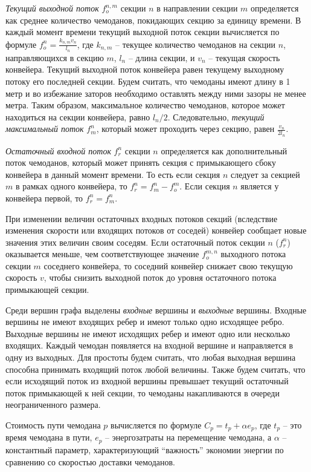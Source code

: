 \documentclass[specification, annotation]{itmo-student-thesis}
\begin{document}
\textit{Текущий выходной поток} $f_o^{n,m}$ секции $n$ в направлении секции
$m$ определяется как среднее количество чемоданов, покидающих секцию за единицу
времени. В каждый момент времени текущий выходной поток секции вычисляется по
формуле $f_o^n = \frac{k_{n,m} v_n}{l_n}$, где $k_{n,m}$ -- текущее количество чемоданов
на секции $n$, направляющихся в секцию $m$, $l_n$ -- длина секции, и $v_n$ --
текущая скорость конвейера. Текущий выходной поток конвейера равен текущему
выходному потоку его последней секции. Будем считать, что чемоданы имеют длину в
1 метр и во избежание заторов необходимо оставлять между ними зазоры не менее
метра. Таким образом, максимальное количество чемоданов, которое может
находиться на секции конвейера, равно $l_n/2$. Следовательно, \textit{текущий максимальный поток} $f_m^n$, который может
проходить через секцию, равен $\frac{v_n}{2l_n}$.

\textit{Остаточный входной поток} $f_r^n$ секции $n$ определяется как дополнительный поток
чемоданов, который может принять секция с примыкающего сбоку конвейера в данный момент
времени. То есть если секция $n$ следует за секцией $m$ в рамках одного
конвейера, то $f_r^n = f_m^n - f_o^m$. Если секция $n$ является у конвейера
первой, то $f_r^n = f_m^n$.

При изменении величин остаточных входных потоков секций (вследствие изменения
скорости или входящих потоков от соседей) конвейер сообщает новые значения этих
величин своим соседям. Если остаточный поток секции $n$ ($f_r^n$) оказывается меньше, чем
соответствующее значение $f_o^{m,n}$ выходного потока секции $m$ соседнего конвейера, то
соседний конвейер снижает свою текущую скорость $v$, чтобы снизить выходной
поток до уровня остаточного потока примыкающей секции.

Среди вершин графа выделены \textit{входные} вершины и \textit{выходные}
вершины. Входные вершины не имеют входящих ребер и имеют только одно исходящее
ребро. Выходные вершины не имеют исходящих ребер и имеют одно или несколько
входящих. Каждый чемодан появляется на входной вершине и направляется в одну из
выходных. Для простоты будем считать, что любая выходная вершина способна
принимать входящий поток любой величины. Также будем считать, что если исходящий
поток из входной вершины превышает текущий остаточный поток примыкающей к ней
секции, то чемоданы накапливаются в очереди неограниченного размера.

Стоимость пути чемодана $p$ вычисляется по формуле $C_p = t_p + \alpha e_p$, где
$t_p$ -- это время чемодана в пути, $e_p$ -- энергозатраты на перемещение чемодана,
а $\alpha$ -- константный параметр, характеризующий ``важность'' экономии
энергии по сравнению со скоростью доставки чемоданов.
\end{document}
